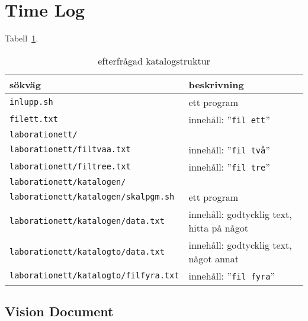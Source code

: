 %
%
%
%


\section{Time Log}\label{time-log}

Tabell~\ref{table-timelog}.
                                                                                                           
\begin{table}[]
  \centering
  \caption{efterfrågad katalogstruktur}
  \label{table-timelog}
  \begin{tabular}{@{}ll@{}}
    \toprule
            sökväg                               & beskrivning                               \\ \midrule
    \texttt{inlupp.sh}                           & ett program                               \\
    \texttt{filett.txt}                          & innehåll: ''\texttt{fil ett}''            \\
    \texttt{laborationett/}                      &                                           \\
    \texttt{laborationett/filtvaa.txt}           & innehåll: ''\texttt{fil två}''            \\
    \texttt{laborationett/filtree.txt}           & innehåll: ''\texttt{fil tre}''            \\
    \texttt{laborationett/katalogen/}            &                                           \\
    \texttt{laborationett/katalogen/skalpgm.sh}  & ett program                               \\
    \texttt{laborationett/katalogen/data.txt}    & innehåll: godtycklig text, hitta på något \\
    \texttt{laborationett/katalogto/data.txt}    & innehåll: godtycklig text, något annat    \\
    \texttt{laborationett/katalogto/filfyra.txt} & innehåll: ''\texttt{fil fyra}''           \\ \bottomrule
  \end{tabular}
\end{table}


\subsection{Vision Document}\label{task-3-project-plan}
